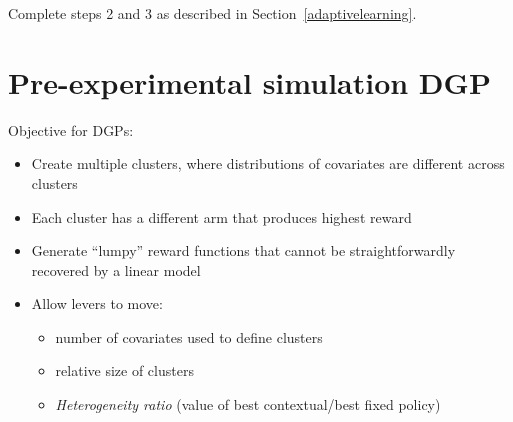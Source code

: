 \documentclass[letterpaper, 12pt, parskip=full,DIV=10]{scrartcl}
\begin{document}
\begin{enumerate}
\end{enumerate}

Complete steps 2 and 3 as described in Section~\ref{adaptivelearning}. 



\section{Pre-experimental simulation DGP}\label{appendix:dgp}

Objective for DGPs:
\begin{itemize}
    \item Create multiple clusters, where distributions of covariates are different across clusters
    \item Each cluster has a different arm that produces highest reward
    \item Generate ``lumpy'' reward functions that cannot be straightforwardly recovered by a linear model
    \item Allow levers to move:
    \begin{itemize}
        \item number of covariates used to define clusters
        \item relative size of clusters
        \item \textit{Heterogeneity ratio} (value of best contextual/best fixed policy)
    \end{itemize} 
\end{itemize}
\end{document}
